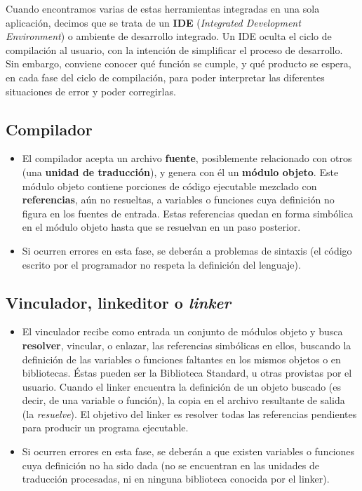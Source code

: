 Cuando encontramos varias de estas herramientas integradas en una sola aplicación, decimos que se trata de un \textbf{IDE} (\textit{Integrated Development Environment}) o ambiente de desarrollo integrado. Un IDE oculta el ciclo de compilación al usuario, con la intención de simplificar el proceso de desarrollo. Sin embargo, conviene conocer qué función se cumple, y qué producto se espera, en cada fase del ciclo de compilación, para poder interpretar las diferentes situaciones de error y poder corregirlas.


\subsection{Compilador}
\begin{itemize}
	\item El compilador acepta un archivo \textbf{fuente}, posiblemente relacionado con
otros (una \textbf{unidad de traducción}), y genera con él un
\textbf{módulo objeto}. Este módulo objeto contiene porciones de
código ejecutable mezclado con \textbf{referencias}, aún no resueltas, a
variables o funciones cuya definición no figura en los fuentes de
entrada. Estas referencias quedan en forma simbólica en el módulo
objeto hasta que se resuelvan en un paso posterior. 
\item Si ocurren errores en esta fase, se deberán a problemas de sintaxis (el código escrito por el programador no respeta la definición del lenguaje).
\end{itemize}

\subsection{Vinculador, linkeditor o \textit{linker}}
\begin{itemize}
\item El vinculador recibe como entrada un conjunto de módulos objeto y
busca \textbf{resolver}, vincular, o enlazar, las referencias simbólicas en ellos,
buscando la definición de las variables o funciones faltantes en los
mismos objetos o en bibliotecas. Éstas pueden ser la Biblioteca
Standard, u otras provistas por el usuario. Cuando el linker encuentra la
definición de un objeto buscado (es decir, de una variable o
función), la copia en el archivo resultante de salida (la
\textit{resuelve}). El objetivo del linker es resolver todas las
referencias pendientes para producir un programa ejecutable. 
\item Si ocurren errores en esta fase, se deberán a que existen variables o funciones cuya definición no ha sido dada (no se encuentran en las unidades de traducción procesadas, ni en ninguna biblioteca conocida por el linker).
\end{itemize}

